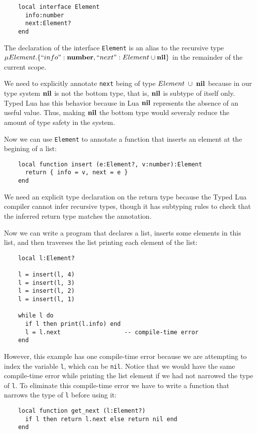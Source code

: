 \begin{verbatim}
    local interface Element
      info:number
      next:Element?
    end
\end{verbatim}

The declaration of the interface \texttt{Element} is an alias to the
recursive type
$\mu Element.\{``info":\mathbf{number}, ``next":Element \cup \mathbf{nil}\}$ in the
remainder of the current scope.

We need to explicitly annotate \texttt{next} being of type
$Element\;\cup\;\mathbf{nil}$ because in our type system $\mathbf{nil}$
is not the bottom type, that is, $\mathbf{nil}$ is subtype of itself only.
Typed Lua has this behavior because in Lua $\mathbf{nil}$ represents
the absence of an useful value.
Thus, making $\mathbf{nil}$ the bottom type would severaly reduce the amount
of type safety in the system.

Now we can use \texttt{Element} to annotate a function that
inserts an element at the begining of a list:
\begin{verbatim}
    local function insert (e:Element?, v:number):Element 
      return { info = v, next = e }
    end
\end{verbatim}

We need an explicit type declaration on the return type because
the Typed Lua compiler cannot infer recursive types, though
it has subtyping rules to check that the inferred return type
matches the annotation.

Now we can write a program that declares a list, inserts some
elements in this list, and then traverses the list printing
each element of the list:
\begin{verbatim}
    local l:Element?

    l = insert(l, 4)
    l = insert(l, 3)
    l = insert(l, 2)
    l = insert(l, 1)

    while l do
      if l then print(l.info) end
      l = l.next                  -- compile-time error
    end
\end{verbatim}

However, this example has one compile-time error because we
are attempting to index the variable \texttt{l},
which can be \texttt{nil}.
Notice that we would have the same compile-time error while
printing the list element if we had not narrowed the type of
\texttt{l}.
To eliminate this compile-time error we have to write a
function that narrows the type of \texttt{l} before using it:
\begin{verbatim}
    local function get_next (l:Element?)
      if l then return l.next else return nil end
    end
\end{verbatim}

